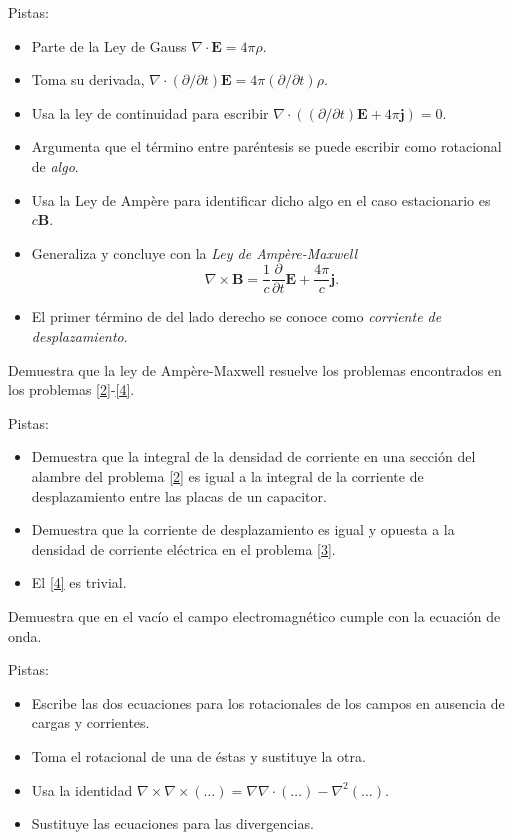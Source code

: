 \documentclass{exam}
\begin{document}
\begin{questions}
  Pistas:
  \begin{itemize}
  \item Parte de la Ley de Gauss $\nabla\cdot\bm E=4\pi\rho$.
  \item Toma su derivada, $\nabla\cdot(\partial/\partial t)\bm
    E=4\pi(\partial/\partial t)\rho$.
  \item Usa la ley de continuidad para escribir
    $\nabla\cdot\left((\partial/\partial t)\bm E+4\pi\bm j\right)=0$.
  \item Argumenta que el término entre paréntesis se puede escribir
    como rotacional de {\em algo}.
  \item Usa la Ley de Ampère para identificar dicho algo en el caso
    estacionario es $c\bm B$.
  \item Generaliza y concluye con la {\em Ley de Ampère-Maxwell}
    $$
    \nabla\times\bm B=\frac{1}{c}\frac{\partial}{\partial t}\bm
    E+\frac{4\pi}{c}\bm j.
    $$
  \item El primer término de del lado derecho se conoce como {\em
      corriente de desplazamiento}.
  \end{itemize}
\question\label{6} Demuestra que la ley
  de Ampère-Maxwell resuelve los problemas encontrados en los
  problemas \ref{2}-\ref{4}.

  Pistas:
  \begin{itemize}
  \item Demuestra que la integral de la densidad de corriente en una
    sección del alambre del problema \ref{2} es igual a la integral de
    la corriente de desplazamiento entre las placas de un capacitor.
  \item Demuestra que la corriente de desplazamiento es igual y
    opuesta a la densidad de corriente eléctrica en el problema
    \ref{3}.
  \item El \ref{4} es trivial.
  \end{itemize}
\question\label{7} Demuestra que en el vacío el campo electromagnético cumple
  con la ecuación de onda.

  Pistas:
  \begin{itemize}
  \item Escribe las dos ecuaciones para los rotacionales de los campos
    en ausencia de cargas y corrientes.
  \item Toma el rotacional de una de éstas y sustituye la otra.
  \item Usa la identidad
    $\nabla\times\nabla\times(\ldots)=\nabla\nabla\cdot(\ldots)-\nabla^2(\ldots)$.
  \item Sustituye las ecuaciones para las divergencias.
  \end{itemize}



\end{questions}
\end{document}
